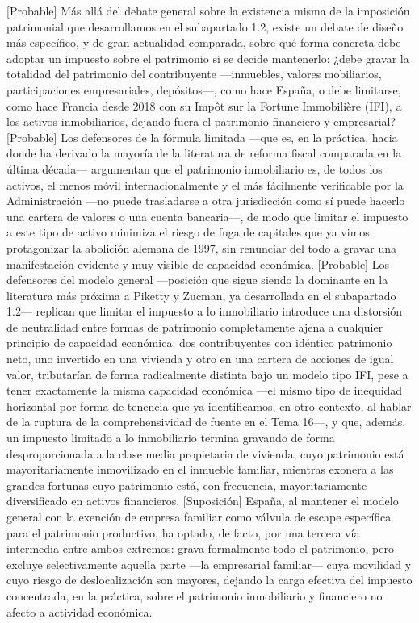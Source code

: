 \documentclass[10pt,a4paper]{article}
\begin{document}
[Probable] Más allá del debate general sobre la existencia misma de la imposición patrimonial que desarrollamos en el subapartado 1.2, existe un debate de diseño más específico, y de gran actualidad comparada, sobre qué forma concreta debe adoptar un impuesto sobre el patrimonio si se decide mantenerlo: ¿debe gravar la totalidad del patrimonio del contribuyente —inmuebles, valores mobiliarios, participaciones empresariales, depósitos—, como hace España, o debe limitarse, como hace Francia desde 2018 con su Impôt sur la Fortune Immobilière (IFI), a los activos inmobiliarios, dejando fuera el patrimonio financiero y empresarial? [Probable] Los defensores de la fórmula limitada —que es, en la práctica, hacia donde ha derivado la mayoría de la literatura de reforma fiscal comparada en la última década— argumentan que el patrimonio inmobiliario es, de todos los activos, el menos móvil internacionalmente y el más fácilmente verificable por la Administración —no puede trasladarse a otra jurisdicción como sí puede hacerlo una cartera de valores o una cuenta bancaria—, de modo que limitar el impuesto a este tipo de activo minimiza el riesgo de fuga de capitales que ya vimos protagonizar la abolición alemana de 1997, sin renunciar del todo a gravar una manifestación evidente y muy visible de capacidad económica. [Probable] Los defensores del modelo general —posición que sigue siendo la dominante en la literatura más próxima a Piketty y Zucman, ya desarrollada en el subapartado 1.2— replican que limitar el impuesto a lo inmobiliario introduce una distorsión de neutralidad entre formas de patrimonio completamente ajena a cualquier principio de capacidad económica: dos contribuyentes con idéntico patrimonio neto, uno invertido en una vivienda y otro en una cartera de acciones de igual valor, tributarían de forma radicalmente distinta bajo un modelo tipo IFI, pese a tener exactamente la misma capacidad económica —el mismo tipo de inequidad horizontal por forma de tenencia que ya identificamos, en otro contexto, al hablar de la ruptura de la comprehensividad de fuente en el Tema 16—, y que, además, un impuesto limitado a lo inmobiliario termina gravando de forma desproporcionada a la clase media propietaria de vivienda, cuyo patrimonio está mayoritariamente inmovilizado en el inmueble familiar, mientras exonera a las grandes fortunas cuyo patrimonio está, con frecuencia, mayoritariamente diversificado en activos financieros. [Suposición] España, al mantener el modelo general con la exención de empresa familiar como válvula de escape específica para el patrimonio productivo, ha optado, de facto, por una tercera vía intermedia entre ambos extremos: grava formalmente todo el patrimonio, pero excluye selectivamente aquella parte —la empresarial familiar— cuya movilidad y cuyo riesgo de deslocalización son mayores, dejando la carga efectiva del impuesto concentrada, en la práctica, sobre el patrimonio inmobiliario y financiero no afecto a actividad económica.
\end{document}
